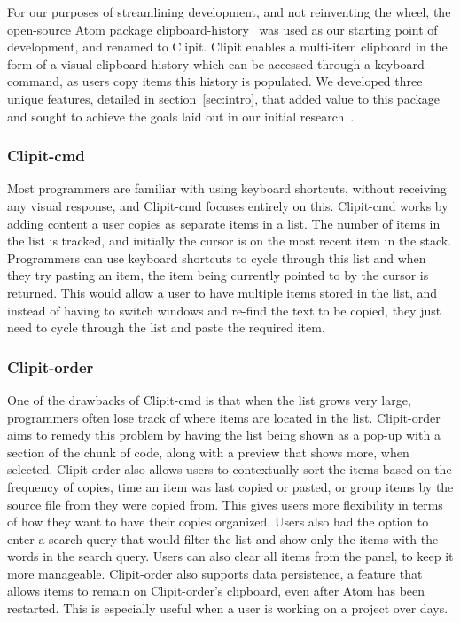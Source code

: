 \documentclass{acm_proc_article-sp}
\begin{document}
For our purposes of streamlining development, and not reinventing the wheel, the open-source Atom package clipboard-history~\cite{Atom_C_History} was used as our starting point of development, and renamed to Clipit. Clipit enables a multi-item clipboard in the form of a visual clipboard history which can be accessed through a keyboard command, as users copy items this history is populated. We developed three unique features, detailed in section~\ref{sec:intro}, that added value to this package and sought to achieve the goals laid out in our initial research~\cite{janReport}.

\subsubsection{Clipit-cmd}\label{sec:features_cmd}

Most programmers are familiar with using keyboard shortcuts, without receiving any visual response, and Clipit-cmd focuses entirely on this. Clipit-cmd works by adding content a user copies as separate items in a list. The number of items in the list is tracked, and initially the cursor is on the most recent item in the stack. Programmers can use keyboard shortcuts to cycle through this list and when they try pasting an item, the item being currently pointed to by the cursor is returned. This would allow a user to have multiple items stored in the list, and instead of having to switch windows and re-find the text to be copied, they just need to cycle through the list and paste the required item. 

\subsubsection{Clipit-order}\label{sec:features_order}

One of the drawbacks of Clipit-cmd is that when the list grows very large, programmers often lose track of where items are located in the list. Clipit-order aims to remedy this problem by having the list being shown as a pop-up with a section of the chunk of code, along with a preview that shows more, when selected. Clipit-order also allows users to contextually sort the items based on the frequency of copies, time an item was last copied or pasted, or group items by the source file from they were copied from. This gives users more flexibility in terms of how they want to have their copies organized. Users also had the option to enter a search query that would filter the list and show only the items with the words in the search query. Users can also clear all items from the panel, to keep it more manageable. Clipit-order also supports data persistence, a feature that allows items to remain on Clipit-order's clipboard, even after Atom has been restarted. This is especially useful when a user is working on a project over days.
\end{document}
